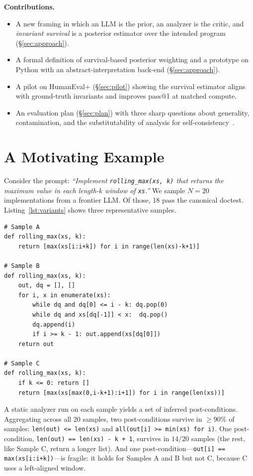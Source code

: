 \documentclass[sigconf,review,anonymous,nonacm]{acmart}
\begin{document}
\smallskip\noindent\textbf{Contributions.}
\begin{itemize}
\item A new framing in which an LLM is the prior, an analyzer is the
critic, and \emph{invariant survival} is a posterior estimator over the
intended program (\S\ref{sec:approach}).
\item A formal definition of survival-based posterior weighting and a
prototype on Python with an abstract-interpretation back-end
(\S\ref{sec:approach}).
\item A pilot on HumanEval+ (\S\ref{sec:pilot}) showing the survival
estimator aligns with ground-truth invariants and improves pass@1 at
matched compute.
\item An evaluation plan (\S\ref{sec:plan}) with three sharp questions
about generality, contamination, and the substitutability of analysis
for self-consistency~\cite{wang2023selfconsistency}.
\end{itemize}

\section{A Motivating Example}
\label{sec:motivation}

Consider the prompt: \emph{``Implement \texttt{rolling\_max(xs, k)} that
returns the maximum value in each length-$k$ window of \texttt{xs}.''}
We sample $N=20$ implementations from a frontier LLM. Of those, 18 pass
the canonical doctest. Listing~\ref{lst:variants} shows three
representative samples.

\begin{lstlisting}[caption={Three samples for the same prompt. All pass the
canonical doctest.},label={lst:variants}]
# Sample A
def rolling_max(xs, k):
    return [max(xs[i:i+k]) for i in range(len(xs)-k+1)]

# Sample B
def rolling_max(xs, k):
    out, dq = [], []
    for i, x in enumerate(xs):
        while dq and dq[0] <= i - k: dq.pop(0)
        while dq and xs[dq[-1]] < x:  dq.pop()
        dq.append(i)
        if i >= k - 1: out.append(xs[dq[0]])
    return out

# Sample C
def rolling_max(xs, k):
    if k <= 0: return []
    return [max(xs[max(0,i-k+1):i+1]) for i in range(len(xs))]
\end{lstlisting}

A static analyzer run on each sample yields a set of inferred
post-conditions. Aggregating across all 20 samples, two post-conditions
survive in $\geq 90\%$ of samples: \texttt{len(out) <= len(xs)} and
\texttt{all(out[i] >= min(xs) for i)}. One post-condition, \texttt{len(out)
== len(xs) - k + 1}, survives in $14/20$ samples (the rest, like Sample
C, return a longer list). And one post-condition---\texttt{out[i] ==
max(xs[i:i+k])}---is fragile: it holds for Samples A and B but not C,
because C uses a left-aligned window.
\end{document}
